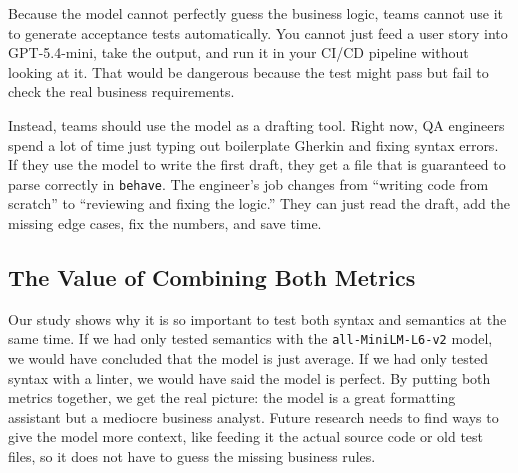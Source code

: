 Because the model cannot perfectly guess the business logic, teams cannot use it to generate acceptance tests automatically. You cannot just feed a user story into GPT-5.4-mini, take the output, and run it in your CI/CD pipeline without looking at it. That would be dangerous because the test might pass but fail to check the real business requirements.

Instead, teams should use the model as a drafting tool. Right now, QA engineers spend a lot of time just typing out boilerplate Gherkin and fixing syntax errors. If they use the model to write the first draft, they get a file that is guaranteed to parse correctly in \texttt{behave}. The engineer's job changes from ``writing code from scratch'' to ``reviewing and fixing the logic.'' They can just read the draft, add the missing edge cases, fix the numbers, and save time. 

\subsection{The Value of Combining Both Metrics}

Our study shows why it is so important to test both syntax and semantics at the same time. If we had only tested semantics with the \texttt{all-MiniLM-L6-v2} model, we would have concluded that the model is just average. If we had only tested syntax with a linter, we would have said the model is perfect. By putting both metrics together, we get the real picture: the model is a great formatting assistant but a mediocre business analyst. Future research needs to find ways to give the model more context, like feeding it the actual source code or old test files, so it does not have to guess the missing business rules.
